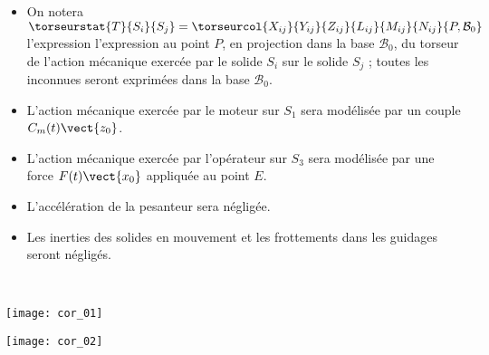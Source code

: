 \begin{itemize}
\item On notera $\torseurstat{T}{S_i}{S_j}=\torseurcol{X_{ij}}{Y_{ij}}{Z_{ij}}{L_{ij}}{M_{ij}}{N_{ij}}{P,\mathcal{B}_0}$ l'expression l’expression au point $P$, en projection dans la
base $\mathcal{B}_0$, du torseur de l’action mécanique exercée par le solide $S_i$ sur le solide $S_j$ ; toutes
les inconnues seront exprimées dans la base $\mathcal{B}_0$.
\item L’action mécanique exercée par le moteur sur $S_1$ sera modélisée par un couple $C_m(t) \vect{z_0}$.
\item L’action mécanique exercée par l’opérateur sur $S_3$ sera modélisée par une force $F(t) \vect{x_0}$
appliquée au point $E$.
\item L’accélération de la pesanteur sera négligée.%
\item Les inerties des solides en mouvement et les frottements dans les guidages seront négligés.
\end{itemize}
\fi

\ifprof
\begin{corrige}~\\

\begin{center}
\texttt{[image: cor\_01]}
\end{center}

\begin{center}
\texttt{[image: cor\_02]}
\end{center}
\end{corrige}
\else
\fi


\ifnormal 

\ifprof
\begin{corrige}~\\
\end{corrige}
\else
\fi
\else
\fi


